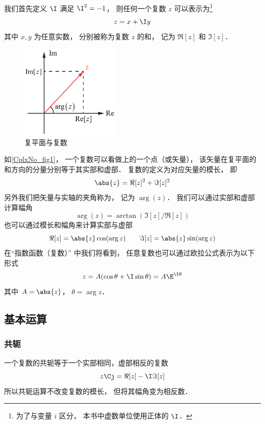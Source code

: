
我们首先定义 $\I$ 满足 $\I^2 = -1$， 则任何一个复数 $z$ 可以表示为\footnote{为了与变量 $i$ 区分， 本书中虚数单位使用正体的 $\I$．}
\begin{equation}
z = x + \I y
\end{equation}
其中 $x,y$ 为任意实数， 分别被称为复数 $z$ 的和， 记为 $\Re[z]$ 和 $\Im[z]$．

\begin{figure}[ht]
\centering
\includegraphics[width=4.7cm]{./figures/CplxNo1.pdf}
\caption{复平面与复数} \label{CplxNo_fig1}
\end{figure}

如\autoref{CplxNo_fig1}， 一个复数可以看做上的一个点（或矢量）， 该矢量在复平面的和方向的分量分别等于其实部和虚部． 复数的定义为对应矢量的模长， 即
\begin{equation}
\abs{z} = \Re[z]^2 + \Im[z]^2
\end{equation}
另外我们把矢量与实轴的夹角称为， 记为 $\arg(z)$． 我们可以通过实部和虚部计算幅角%
\begin{equation}
\arg(z) = \arctan(\Im[z]/\Re[z])
\end{equation}
也可以通过模长和幅角来计算实部与虚部
\begin{equation}
\Re[z] = \abs{z}\cos(\arg z) \qquad \Im[z] = \abs{z}\sin(\arg z)
\end{equation}
在“指数函数（复数）” 中我们将看到， 任意复数也可以通过欧拉公式表示为以下形式
\begin{equation}
z = A(\cos\theta + \I\sin\theta) = A\E^{\I\theta}
\end{equation}
其中 $A = \abs{z}$， $\theta = \arg z$．

\subsection{基本运算}
\subsubsection{共轭}
一个复数的共轭等于一个实部相同，虚部相反的复数
\begin{equation}
z\Cj = \Re[z] - \I \Im[z]
\end{equation}
所以共轭运算不改变复数的模长， 但将其幅角变为相反数．

